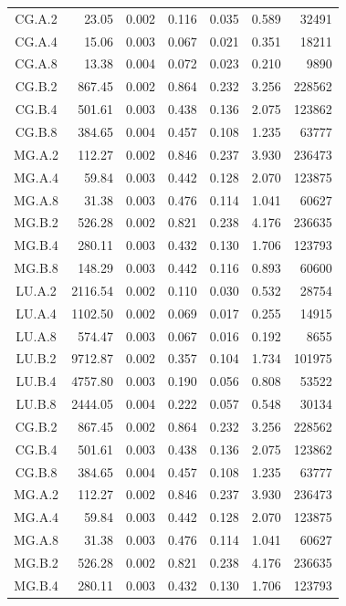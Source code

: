 \begin{longtable}[c]{@{}c*{6}{r}@{}}
  CG.A.2 & 23.05 & 0.002 & 0.116 & 0.035 & 0.589 & 32491 \\
  CG.A.4 & 15.06 & 0.003 & 0.067 & 0.021 & 0.351 & 18211 \\
  CG.A.8 & 13.38 & 0.004 & 0.072 & 0.023 & 0.210 & 9890 \\
  CG.B.2 & 867.45 & 0.002 & 0.864 & 0.232 & 3.256 & 228562 \\
  CG.B.4 & 501.61 & 0.003 & 0.438 & 0.136 & 2.075 & 123862 \\
  CG.B.8 & 384.65 & 0.004 & 0.457 & 0.108 & 1.235 & 63777 \\
  MG.A.2 & 112.27 & 0.002 & 0.846 & 0.237 & 3.930 & 236473 \\
  MG.A.4 & 59.84 & 0.003 & 0.442 & 0.128 & 2.070 & 123875 \\
  MG.A.8 & 31.38 & 0.003 & 0.476 & 0.114 & 1.041 & 60627 \\
  MG.B.2 & 526.28 & 0.002 & 0.821 & 0.238 & 4.176 & 236635 \\
  MG.B.4 & 280.11 & 0.003 & 0.432 & 0.130 & 1.706 & 123793 \\
  MG.B.8 & 148.29 & 0.003 & 0.442 & 0.116 & 0.893 & 60600 \\
  LU.A.2 & 2116.54 & 0.002 & 0.110 & 0.030 & 0.532 & 28754 \\
  LU.A.4 & 1102.50 & 0.002 & 0.069 & 0.017 & 0.255 & 14915 \\
  LU.A.8 & 574.47 & 0.003 & 0.067 & 0.016 & 0.192 & 8655 \\
  LU.B.2 & 9712.87 & 0.002 & 0.357 & 0.104 & 1.734 & 101975 \\
  LU.B.4 & 4757.80 & 0.003 & 0.190 & 0.056 & 0.808 & 53522 \\
  LU.B.8 & 2444.05 & 0.004 & 0.222 & 0.057 & 0.548 & 30134 \\
  CG.B.2 & 867.45 & 0.002 & 0.864 & 0.232 & 3.256 & 228562 \\
  CG.B.4 & 501.61 & 0.003 & 0.438 & 0.136 & 2.075 & 123862 \\
  CG.B.8 & 384.65 & 0.004 & 0.457 & 0.108 & 1.235 & 63777 \\
  MG.A.2 & 112.27 & 0.002 & 0.846 & 0.237 & 3.930 & 236473 \\
  MG.A.4 & 59.84 & 0.003 & 0.442 & 0.128 & 2.070 & 123875 \\
  MG.A.8 & 31.38 & 0.003 & 0.476 & 0.114 & 1.041 & 60627 \\
  MG.B.2 & 526.28 & 0.002 & 0.821 & 0.238 & 4.176 & 236635 \\
  MG.B.4 & 280.11 & 0.003 & 0.432 & 0.130 & 1.706 & 123793 \\

\end{longtable}
